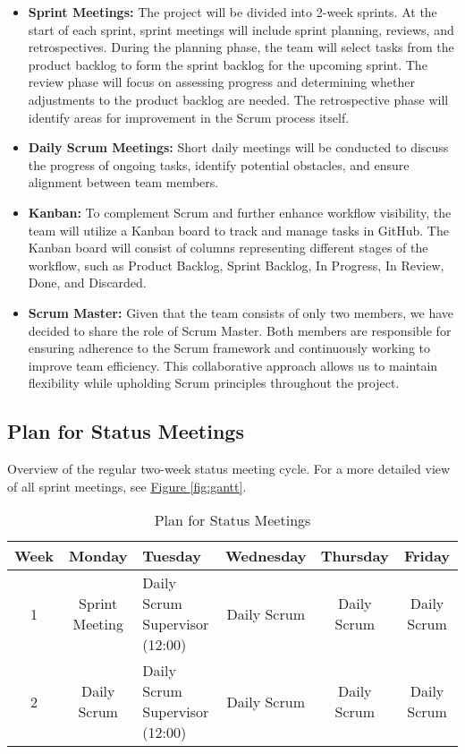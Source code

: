 \begin{itemize}
    \item \textbf{Sprint Meetings:} The project will be divided into 2-week sprints. At the start of each sprint, sprint meetings will include sprint planning, reviews, and retrospectives. During the planning phase, the team will select tasks from the product backlog to form the sprint backlog for the upcoming sprint. The review phase will focus on assessing progress and determining whether adjustments to the product backlog are needed. The retrospective phase will identify areas for improvement in the Scrum process itself.
    \item \textbf{Daily Scrum Meetings:} Short daily meetings will be conducted to discuss the progress of ongoing tasks, identify potential obstacles, and ensure alignment between team members.
    \item \textbf{Kanban:} To complement Scrum and further enhance workflow visibility, the team will utilize a Kanban board to track and manage tasks in GitHub. The Kanban board will consist of columns representing different stages of the workflow, such as Product Backlog, Sprint Backlog, In Progress, In Review, Done, and Discarded.
    \item \textbf{Scrum Master:} Given that the team consists of only two members, we have decided to share the role of Scrum Master. Both members are responsible for ensuring adherence to the Scrum framework and continuously working to improve team efficiency. This collaborative approach allows us to maintain flexibility while upholding Scrum principles throughout the project.
\end{itemize}



\subsection{Plan for Status Meetings}
Overview of the regular two-week status meeting cycle. For a more detailed view of all sprint meetings, see \hyperref[fig:gantt]{Figure \ref*{fig:gantt}}.

\begin{table}[H]
    \centering
    \begin{tabularx}{\textwidth}{|c|c|>{\centering\arraybackslash}X|c|c|c|}
    \hline
    \textbf{Week} & \textbf{Monday} & \textbf{Tuesday} & \textbf{Wednesday} & \textbf{Thursday} & \textbf{Friday} \\
    \hline
    1 & Sprint Meeting & \makecell{Daily Scrum \\ Supervisor (12:00)} & Daily Scrum & Daily 
    Scrum & Daily Scrum \\
    \hline
    2 & Daily Scrum & \makecell{Daily Scrum \\ Supervisor (12:00)} & Daily Scrum & Daily 
    Scrum & Daily Scrum \\
    \hline
    \end{tabularx}
    \caption{Plan for Status Meetings}
    \label{tab:meeting_plan}
\end{table}

\newpage
